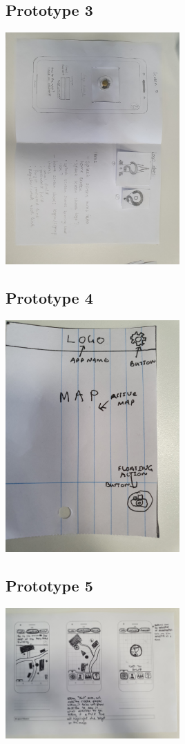 \documentclass[10pt,twocolumn]{article} %
\begin{document}
\subsection*{Prototype 3}
\includegraphics[width=0.5\textwidth]{./figures/zsuzsis_initial_proto/1.jpg}

\newpage
\subsection*{Prototype 4}
\includegraphics[width=0.5\textwidth]{./figures/shauns_initial_proto/1.jpg}

\subsection*{Prototype 5}
\includegraphics[width=0.5\textwidth]{./figures/belindas_initial_proto/1.jpg}
\end{document}
